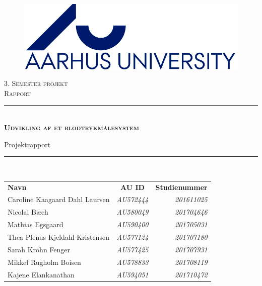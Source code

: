 \thispagestyle{empty}
\newcommand{\HRule}{\rule{\linewidth}{0.1mm}} %

\begin{center}
	\vspace{5cm}
	
	\begin{figure}[h!]
		\centering
		\includegraphics[width=0.5\linewidth]{Forside/AUlogo}
	\end{figure}
	
	\vspace{0.1 in}
	
	\textsc{\large 3. Semester projekt \\Rapport}\\[1.5cm] 
	
	\HRule \\[0.8cm]
	{\huge \bfseries \textsc{Udvikling af et blodtrykmålesystem}} 

	{\LARGE Projektrapport} \\[0.4cm]
	\HRule \\[1.5cm]
	

	
	
	\vspace{0.2 in}
	\begin{center}
		\begin{tabular}{l c r}
			\textbf{Navn} & \textbf{AU ID} & \textbf{Studienummer} \\
			Caroline Kaagaard Dahl Laursen & \textsl{AU572444} & \textsl{201611025}  \\
			Nicolai Bæch & \textsl{AU580049} & \textsl{201704646}  \\
			Mathias Egsgaard & \textsl{AU590400} & \textsl{201705031}  \\
			Thea Plenus Kjeldahl Kristensen & \textsl{AU577124} & \textsl{201707180}  \\
			Sarah Krohn Fenger & \textsl{AU577425} & \textsl{201707931}  \\
			Mikkel Rugholm Boisen & \textsl{AU578833} & \textsl{201708119}  \\
			Kajene Elankanathan & \textsl{AU594051} & \textsl{201710472}  \\
			

\end{tabular}
\end{center}
\end{center}
